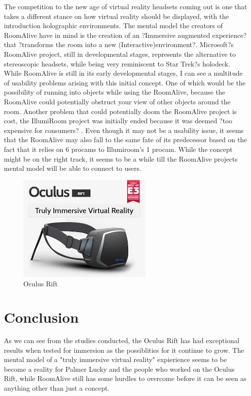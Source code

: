 \documentclass[a4paper]{article}
\begin{document}
\indent The competition to the new age of virtual reality headsets coming out is one that takes a different stance on how virtual reality should be displayed, with the introduction holographic environments. The mental model the creators of RoomAlive have in mind is the creation of an ?Immersive augmented experience?  that ?transforms the room into a new (Interactive)environment?\cite{6}. Microsoft?s RoomAlive project, still in developmental stages, represents the alternative to stereoscopic headsets, while being very reminiscent to Star Trek?s holodeck. While RoomAlive is still in its early developmental stages, I can see a multitude of usability problems arising with this initial concept. One of which would be the possibility of running into objects while using the RoomAlive, because the RoomAlive could potentially obstruct your view of other objects around the room. Another problem that could potentially doom the RoomAlive project is cost, the IllumiRoom project was initially ended because it was deemed ?too expensive for consumers? \cite{6}. Even though it may not be a usability issue, it seems that the RoomAlive may also fall to the same fate of its predecessor based on the fact that it relies on 6 procams to Illumiroom's 1 procam. While the concept might be on the right track, it seems to be a while till the RoomAlive projects mental model will be able to connect to users.


\begin{figure}
\centering
\includegraphics[scale=0.4]{OculusRift.jpg}
\caption{Oculus Rift}
\end{figure}





\section{Conclusion}

\indent \indent As we can see from the studies conducted, the Oculus Rift has had exceptional results when tested for immersion as the possiblities for it continue to grow. The mental model of a "truly immersive virtual reality"\cite{3} expierience seems to be become a reality for Palmer Lucky and the people who worked on the Oculus Rift, while RoomAlive still has some hurdles to overcome before it can be seen as anything other than just a concept. 
\end{document}
